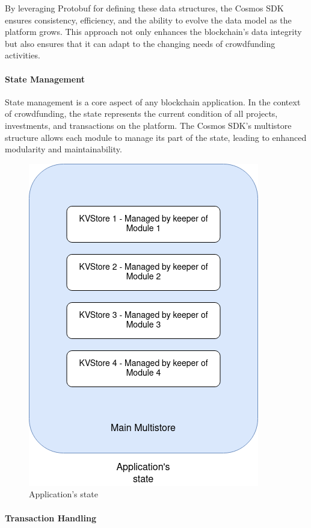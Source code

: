 By leveraging Protobuf for defining these data structures, the Cosmos SDK ensures consistency, efficiency, and the ability to evolve the data model as the platform grows. This approach not only enhances the blockchain's data integrity but also ensures that it can adapt to the changing needs of crowdfunding activities.

\paragraph{State Management}

State management is a core aspect of any blockchain application. In the context of crowdfunding, the state represents the current condition of all projects, investments, and transactions on the platform. The Cosmos SDK's multistore structure allows each module to manage its part of the state, leading to enhanced modularity and maintainability.

\begin{figure}[H]
    \centering
    \includegraphics[scale=0.45]{figures/multistore.png}
    \caption{Application's state}
    \label{fig:application-multistore}
\end{figure}

\paragraph{Transaction Handling}

